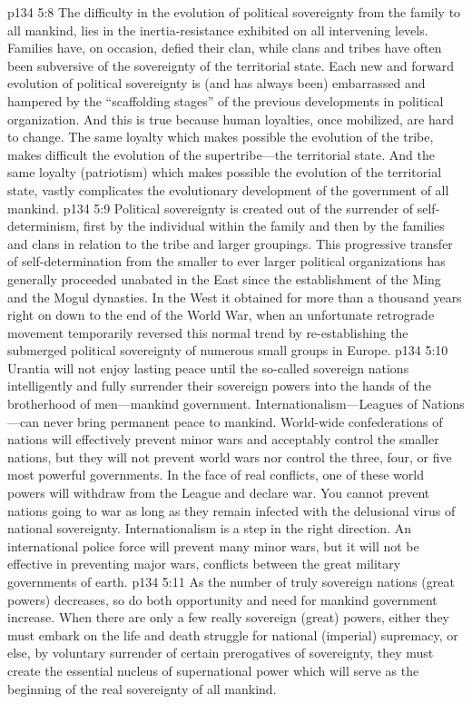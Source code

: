 \vs p134 5:8 The difficulty in the evolution of political sovereignty from the family to all mankind, lies in the inertia\hyp{}resistance exhibited on all intervening levels. Families have, on occasion, defied their clan, while clans and tribes have often been subversive of the sovereignty of the territorial state. Each new and forward evolution of political sovereignty is (and has always been) embarrassed and hampered by the “scaffolding stages” of the previous developments in political organization. And this is true because human loyalties, once mobilized, are hard to change. The same loyalty which makes possible the evolution of the tribe, makes difficult the evolution of the supertribe---the territorial state. And the same loyalty (patriotism) which makes possible the evolution of the territorial state, vastly complicates the evolutionary development of the government of all mankind.
\vs p134 5:9 Political sovereignty is created out of the surrender of self\hyp{}determinism, first by the individual within the family and then by the families and clans in relation to the tribe and larger groupings. This progressive transfer of self\hyp{}determination from the smaller to ever larger political organizations has generally proceeded unabated in the East since the establishment of the Ming and the Mogul dynasties. In the West it obtained for more than a thousand years right on down to the end of the World War, when an unfortunate retrograde movement temporarily reversed this normal trend by re\hyp{}establishing the submerged political sovereignty of numerous small groups in Europe.
\vs p134 5:10 Urantia will not enjoy lasting peace until the so\hyp{}called sovereign nations intelligently and fully surrender their sovereign powers into the hands of the brotherhood of men---mankind government. Internationalism---Leagues of Nations---can never bring permanent peace to mankind. World\hyp{}wide confederations of nations will effectively prevent minor wars and acceptably control the smaller nations, but they will not prevent world wars nor control the three, four, or five most powerful governments. In the face of real conflicts, one of these world powers will withdraw from the League and declare war. You cannot prevent nations going to war as long as they remain infected with the delusional virus of national sovereignty. Internationalism is a step in the right direction. An international police force will prevent many minor wars, but it will not be effective in preventing major wars, conflicts between the great military governments of earth.
\vs p134 5:11 As the number of truly sovereign nations (great powers) decreases, so do both opportunity and need for mankind government increase. When there are only a few really sovereign (great) powers, either they must embark on the life and death struggle for national (imperial) supremacy, or else, by voluntary surrender of certain prerogatives of sovereignty, they must create the essential nucleus of supernational power which will serve as the beginning of the real sovereignty of all mankind.
